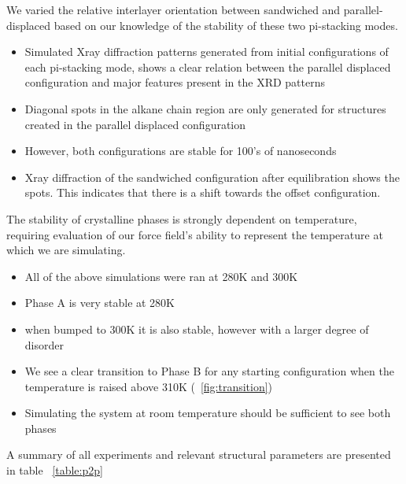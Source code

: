 \documentclass{article}
\begin{document}
	We varied the relative interlayer orientation between sandwiched and parallel-displaced based on our knowledge of the stability of these two pi-stacking modes.
        \begin{itemize}
		\item Simulated Xray diffraction patterns generated from initial configurations of each pi-stacking mode, shows a clear relation between the parallel displaced configuration and major features present in the XRD patterns %
		\item Diagonal spots in the alkane chain region are only generated for structures created in the parallel displaced configuration
		\item However, both configurations are stable for 100's of nanoseconds
		\item Xray diffraction of the sandwiched configuration after equilibration shows the spots. This indicates that there is a shift towards the offset configuration.
	\end{itemize} 

	The stability of crystalline phases is strongly dependent on temperature, requiring evaluation of our force field's ability to represent the temperature at which we are simulating.
	\begin{itemize}
		\item All of the above simulations were ran at 280K and 300K
		\item Phase A is very stable at 280K
		\item when bumped to 300K it is also stable, however with a larger degree of disorder %
		\item We see a clear transition to Phase B for any starting configuration when the temperature is raised above 310K (~\ref{fig:transition})
		\item Simulating the system at room temperature should be sufficient to see both phases
	\end{itemize}

	A summary of all experiments and relevant structural parameters are presented in table ~\ref{table:p2p}
\end{document}
